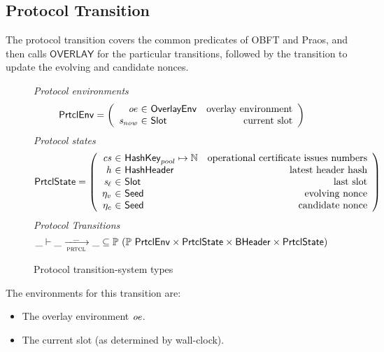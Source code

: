 \clearpage

\subsection{Protocol Transition}
\label{sec:protocol-trans}

The protocol transition covers the common predicates of OBFT and Praos,
and then calls $\mathsf{OVERLAY}$ for the particular transitions,
followed by the transition to update the evolving and candidate nonces.

\begin{figure}
  \emph{Protocol environments}
  \begin{equation*}
    \PrtclEnv =
    \left(
      \begin{array}{r@{~\in~}lr}
        \var{oe} & \OverlayEnv & \text{overlay environment} \\
        \var{s_{now}} & \Slot & \text{current slot} \\
      \end{array}
    \right)
  \end{equation*}
  \emph{Protocol states}
  \begin{equation*}
    \PrtclState =
    \left(
      \begin{array}{r@{~\in~}lr}
        \var{cs} & \HashKey_{pool} \mapsto \N & \text{operational certificate issues numbers} \\
        \var{h} & \HashHeader & \text{latest header hash} \\
        \var{s_\ell} & \Slot & \text{last slot} \\
        \eta_v & \Seed & \text{evolving nonce} \\
        \eta_c & \Seed & \text{candidate nonce} \\
      \end{array}
    \right)
  \end{equation*}
  \emph{Protocol Transitions}
  \begin{equation*}
    \_ \vdash \var{\_} \trans{prtcl}{\_} \var{\_} \subseteq
    \powerset (\powerset{\PrtclEnv} \times \PrtclState \times \BHeader \times \PrtclState)
  \end{equation*}
  \caption{Protocol transition-system types}
  \label{fig:ts-types:prtcl}
\end{figure}

The environments for this transition are:
\begin{itemize}
  \item The overlay environment $\mathit{oe}$.
  \item The current slot (as determined by wall-clock).
\end{itemize}


